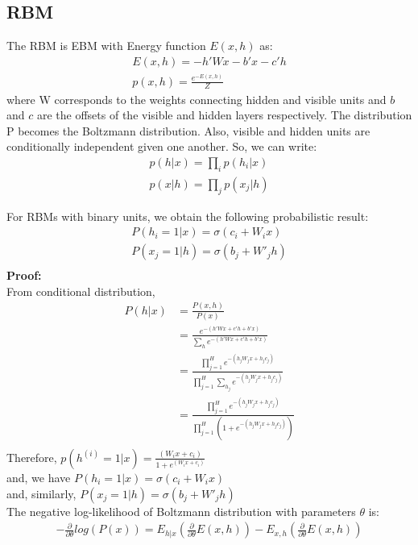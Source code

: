 \subsection{RBM}
The RBM is EBM with Energy function $E(x,h)$ as:
\begin{eqnarray}
E(x,h) = -h'Wx - b'x - c'h \\
p(x,h) = \frac{e^{-E(x,h)}}{Z}
\end{eqnarray}
where W corresponds to the weights connecting hidden and visible units and $b$ and $c$ are the offsets of the visible and hidden layers respectively. The distribution P becomes the Boltzmann distribution.
Also, visible and hidden units are conditionally independent given one another. So, we can write:
\begin{align*}
p(h|x) = \prod_{i} p(h_i|x)\\
p(x|h) = \prod_{j} p(x_j|h)
\end{align*}

For RBMs with binary units, we obtain the following probabilistic result:
\begin{equation*}
	\begin{multlined}
P(h_i = 1|x) = \sigma(c_i + W_i x)\\
P(x_j = 1|h) = \sigma(b_j + {W'}_j h)\\
	\end{multlined}
\end{equation*}
\textbf{Proof:}\\
From conditional distribution,\\
\begin{align*}
P(h|x) & = \frac{P(x,h)}{P(x)}\\
& = \frac{e^{-(h'Wx + c'h + b'x)}}{\sum_h e^{-(h'Wx+c'h+b'x)}}\\
& = \frac{\prod_{j=1}^{H}e^{-(h_j W_j x + h_j c_j)}}{\prod_{j=1}^{H}\sum_{h_j} e^{-(h_j W_j x + h_j c_j)}}\\
& = \frac{\prod_{j=1}^{H}e^{-(h_j W_j x + h_j c_j)}}{\prod_{j=1}^{H}(1 + e^{-(h_j W_j x + h_j c_j)})}\\
\end{align*}
Therefore, $p(h^{(i)} = 1 | x) = \frac{(W_i x + c_i)}{1+e^{(W_i x + c_i)}}$\\
and, we have $P(h_i = 1|x) = \sigma(c_i + {W}_ix)$\\
and, similarly, $P(x_j = 1|h) = \sigma(b_j + {W'}_jh)$\\




The negative log-likelihood of Boltzmann distribution with parameters $\theta$ is:
\begin{eqnarray}
-\frac{\partial}{\partial \theta}log(P(x)) = E_{h|x} (\frac{\partial}{\partial \theta}E(x,h)) - E_{x,h}(\frac{\partial}{\partial \theta}E(x,h))
\end{eqnarray}

